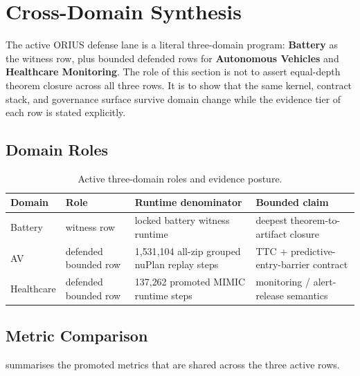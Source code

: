 \section{Cross-Domain Synthesis}\label{sec:crossdomain}

The active ORIUS defense lane is a literal three-domain program:
\textbf{Battery} as the witness row, plus bounded defended rows for
\textbf{Autonomous Vehicles} and \textbf{Healthcare Monitoring}.  The role of this
section is not to assert equal-depth theorem closure across all three rows.  It is
to show that the same \dcs{} kernel, contract stack, and governance surface survive
domain change while the evidence tier of each row is stated explicitly.

\subsection{Domain Roles}

\begin{table}[t]
\caption{Active three-domain roles and evidence posture.}
\label{tab:cross_domain_roles}
\centering\footnotesize
\begin{tabularx}{\textwidth}{p{} p{} p{} X}
\toprule
\textbf{Domain} & \textbf{Role} & \textbf{Runtime denominator} & \textbf{Bounded claim} \\
\midrule
Battery & witness row & locked battery witness runtime & deepest theorem-to-artifact closure \\
AV & defended bounded row & 1{,}531{,}104 all-zip grouped nuPlan replay steps & TTC + predictive-entry-barrier contract \\
Healthcare & defended bounded row & 137{,}262 promoted MIMIC runtime steps & monitoring / alert-release semantics \\
\bottomrule
\end{tabularx}
\end{table}

\subsection{Metric Comparison}

 summarises the promoted metrics that are
shared across the three active rows.

